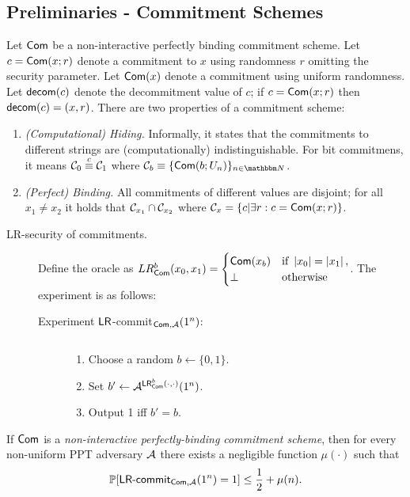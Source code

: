\subsection{Preliminaries - Commitment Schemes}
Let ${\sf Com}$ be a non-interactive perfectly binding commitment scheme. Let $c={\sf Com}(x;r)$ denote a commitment to $x$ using randomness $r$ omitting the security parameter. Let ${\sf Com}(x)$ denote a commitment using uniform randomness. Let ${\sf decom}(c)$ denote the decommitment value of $c$; if $c={\sf Com}(x;r)$ then ${\sf decom}(c)=(x,r)$.
There are two properties of a commitment scheme:
\begin{enumerate}
\item {\it (Computational) Hiding.} Informally, it states that the commitments to different strings are (computationally) indistinguishable. For bit commitmens, it means $\mathcal{C}_0\stackrel{c}{\equiv}\mathcal{C}_1$ where $\calC_b\equiv\{\com(b;U_n)\}_{n\in\N}$.
\item {\it (Perfect) Binding.} All commitments of different values are disjoint; for all $x_1\neq x_2$ it holds that $\mathcal{C}_{x_1}\cap\mathcal{C}_{x_2}$ where $\mathcal{C}_{x}=\{c|\exists r:c={\sf Com}(x;r)\}$.
\end{enumerate}
\begin{description}
\item[LR-security of commitments.] Define the oracle as $LR^b_{{\sf Com}}(x_0,x_1)=\begin{cases}{\sf Com}(x_b) & \text{if } \left|x_0\right|=\left|x_1\right|,\\ \perp & \text{otherwise} \end{cases}$. The experiment is as follows:
\begin{description}
\item[Experiment ${\sf LR}$-commit$_{{\sf Com},\mathcal{A}}(1^n)$:]$ $
\begin{enumerate}
\item Choose a random $b\gets\{0,1\}$.
\item Set $b'\gets\mathcal{A}^{{\sf LR}^b_{{\sf Com}}(\cdot,\cdot)}(1^n)$.
\item Output 1 iff $b'=b$.
\end{enumerate}
\end{description}
\end{description}
\begin{theorem}
If ${\sf Com}$ is a {\it non-interactive perfectly-binding commitment scheme}, then for every non-uniform PPT adversary $\mathcal{A}$ there exists a negligible function $\mu(\cdot)$ such that
$$\mathop{\mathbb P\/}[\text{\sf LR-commit}_{{\sf Com},\mathcal{A}}(1^n)=1]\leq\frac{1}{2}+\mu(n).$$
\end{theorem}
